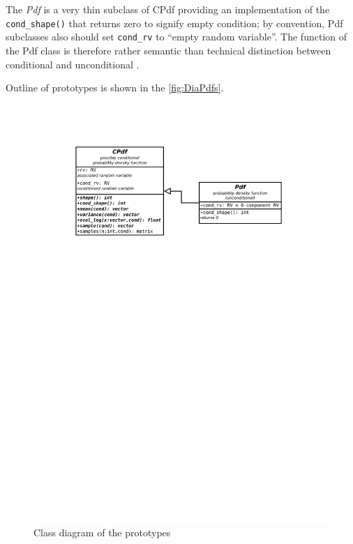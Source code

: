 The \emph{Pdf} is a very thin subclass of CPdf providing an implementation of the \verb|cond_shape()|
that returns zero to signify empty condition; by convention, Pdf subclasses also should set
\verb|cond_rv| to ``empty random variable''. The function of the Pdf class is therefore rather
semantic than technical distinction between conditional and unconditional {\pdfs}.

Outline of {\pdf} prototypes is shown in the \autoref{fig:DiaPdfs}.

\begin{figure}[h!]
	\centering
	\includegraphics[width=\textwidth,keepaspectratio=true,clip=true,trim=3cm 204mm 3cm 3cm]{./diagrams/pdfs.pdf}
	\vspace{-8mm}
	\caption{Class diagram of the {\pdf} prototypes}
	\label{fig:DiaPdfs}
\end{figure}

